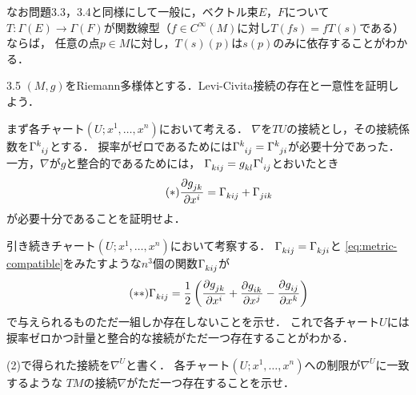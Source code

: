 \documentclass[uplatex,dvipdfmx,fontsize=12pt,jafontsize=11pt,line_length=42zw,number_of_lines=36,hanging_punctuation]{jlreq}
\begin{document}
なお問題3.3，3.4と同様にして一般に，ベクトル束$E$，$F$について
$T\colon\Gamma(E)\to\Gamma(F)$が関数線型（$f\in C^\infty(M)$に対し$T(fs)=fT(s)$である）ならば，
任意の点$p\in M$に対し，$T(s)(p)$は$s(p)$のみに依存することがわかる．

\begin{problems}
	\item[3.5]
		$(M,g)$をRiemann多様体とする．Levi-Civita接続の存在と一意性を証明しよう．
		\begin{subproblems}
			\item
				まず各チャート$(U;x^1,\dots,x^n)$において考える．
				$\nabla$を$TU$の接続とし，その接続係数を$\tensor{\Gamma}{^k_i_j}$とする．
				捩率がゼロであるためには$\tensor{\Gamma}{^k_i_j}=\tensor{\Gamma}{^k_j_i}$が必要十分であった．
				一方，$\nabla$が$g$と整合的であるためには，
				$\tensor{\Gamma}{_k_i_j}=\tensor{g}{_k_l}\tensor{\Gamma}{^l_i_j}$とおいたとき
				\begin{equation}
					\label{eq:metric-compatible}
					\tag{$*$}
					\frac{\partial\tensor{g}{_j_k}}{\partial x^i}
					=\tensor{\Gamma}{_k_i_j}+\tensor{\Gamma}{_j_i_k}
				\end{equation}
				が必要十分であることを証明せよ．
			\item
				引き続きチャート$(U;x^1,\dots,x^n)$において考察する．
				$\tensor{\Gamma}{_k_i_j}=\tensor{\Gamma}{_k_j_i}$と
				\eqref{eq:metric-compatible}をみたすような$n^3$個の関数$\tensor{\Gamma}{_k_i_j}$が
				\begin{equation}
					\label{eq:Levi-Civita}
					\tag{$**$}
					\tensor{\Gamma}{_k_i_j}
					=\frac{1}{2}
					\left(\frac{\partial\tensor{g}{_j_k}}{\partial x^i}
					+\frac{\partial\tensor{g}{_i_k}}{\partial x^j}
					-\frac{\partial\tensor{g}{_i_j}}{\partial x^k}\right)
				\end{equation}
				で与えられるものただ一組しか存在しないことを示せ．
				これで各チャート$U$には捩率ゼロかつ計量と整合的な接続がただ一つ存在することがわかる．
			\item
				(2)で得られた接続を$\nabla^U$と書く．
				各チャート$(U;x^1,\dots,x^n)$への制限が$\nabla^U$に一致するような
				$TM$の接続$\nabla$がただ一つ存在することを示せ．
		\end{subproblems}
\end{problems}
\end{document}
